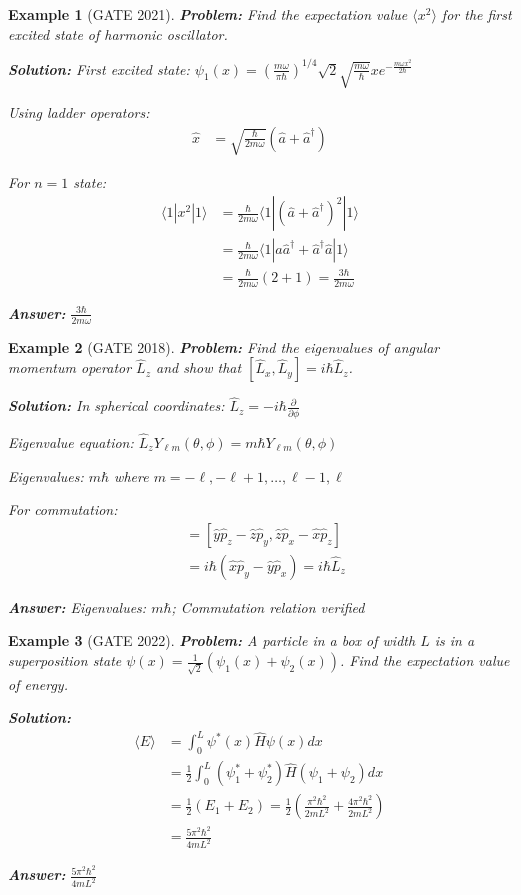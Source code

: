 \documentclass[12pt,a4paper]{article}
\newtheorem{example}{Example}[section]
\newcommand{\ans}[1]{\textcolor{red!70!black}{\textbf{Answer:} #1}}
\newcommand{\sol}{\textcolor{blue!70!black}{\textbf{Solution:}}}
\begin{document}
\begin{example}[GATE 2021]
\textbf{Problem:} Find the expectation value $\langle x^2 \rangle$ for the first excited state of harmonic oscillator.

\sol
First excited state: $\psi_1(x) = \left(\frac{m\omega}{\pi\hbar}\right)^{1/4} \sqrt{2}\sqrt{\frac{m\omega}{\hbar}}x e^{-\frac{m\omega x^2}{2\hbar}}$

Using ladder operators:
\begin{align}
\hat{x} &= \sqrt{\frac{\hbar}{2m\omega}}(\hat{a} + \hat{a}^\dagger)
\end{align}

For $n=1$ state:
\begin{align}
\langle 1|x^2|1 \rangle &= \frac{\hbar}{2m\omega}\langle 1|(\hat{a} + \hat{a}^\dagger)^2|1 \rangle\\
&= \frac{\hbar}{2m\omega}\langle 1|\hat{a}\hat{a}^\dagger + \hat{a}^\dagger\hat{a}|1 \rangle\\
&= \frac{\hbar}{2m\omega}(2 + 1) = \frac{3\hbar}{2m\omega}
\end{align}

\ans{$\frac{3\hbar}{2m\omega}$}
\end{example}

\begin{example}[GATE 2018]
\textbf{Problem:} Find the eigenvalues of angular momentum operator $\hat{L}_z$ and show that $[\hat{L}_x, \hat{L}_y] = i\hbar\hat{L}_z$.

\sol
In spherical coordinates: $\hat{L}_z = -i\hbar\frac{\partial}{\partial\phi}$

Eigenvalue equation: $\hat{L}_z Y_{\ell m}(\theta,\phi) = m\hbar Y_{\ell m}(\theta,\phi)$

Eigenvalues: $m\hbar$ where $m = -\ell, -\ell+1, \ldots, \ell-1, \ell$

For commutation:
\begin{align}
[\hat{L}_x, \hat{L}_y] &= [\hat{y}\hat{p}_z - \hat{z}\hat{p}_y, \hat{z}\hat{p}_x - \hat{x}\hat{p}_z]\\
&= i\hbar(\hat{x}\hat{p}_y - \hat{y}\hat{p}_x) = i\hbar\hat{L}_z
\end{align}

\ans{Eigenvalues: $m\hbar$; Commutation relation verified}
\end{example}

\begin{example}[GATE 2022]
\textbf{Problem:} A particle in a box of width $L$ is in a superposition state $\psi(x) = \frac{1}{\sqrt{2}}(\psi_1(x) + \psi_2(x))$. Find the expectation value of energy.

\sol
\begin{align}
\langle E \rangle &= \int_0^L \psi^*(x)\hat{H}\psi(x) dx\\
&= \frac{1}{2}\int_0^L (\psi_1^* + \psi_2^*)\hat{H}(\psi_1 + \psi_2) dx\\
&= \frac{1}{2}(E_1 + E_2) = \frac{1}{2}\left(\frac{\pi^2\hbar^2}{2mL^2} + \frac{4\pi^2\hbar^2}{2mL^2}\right)\\
&= \frac{5\pi^2\hbar^2}{4mL^2}
\end{align}

\ans{$\frac{5\pi^2\hbar^2}{4mL^2}$}
\end{example}
\end{document}
